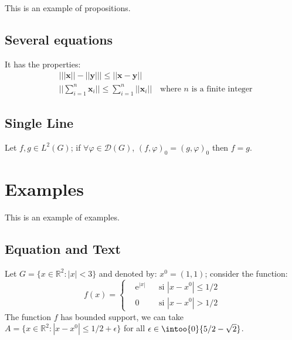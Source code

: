 \documentclass[11pt,fleqn]{book} %
\begin{document}
This is an example of propositions.

\subsection{Several equations}

\begin{proposition}
It has the properties:
\begin{align}
& \big| ||\mathbf{x}|| - ||\mathbf{y}|| \big|\leq || \mathbf{x}- \mathbf{y}||\\
&  ||\sum_{i=1}^n\mathbf{x}_i||\leq \sum_{i=1}^n||\mathbf{x}_i||\quad\text{where $n$ is a finite integer}
\end{align}
\end{proposition}

\subsection{Single Line}

\begin{proposition} 
Let $f,g\in L^2(G)$; if $\forall \varphi\in\mathcal{D}(G)$, $(f,\varphi)_0=(g,\varphi)_0$ then $f = g$. 
\end{proposition}


\section{Examples}

This is an example of examples.

\subsection{Equation and Text}

\begin{example}
Let $G=\{x\in\mathbb{R}^2:|x|<3\}$ and denoted by: $x^0=(1,1)$; consider the function:
\begin{equation}
f(x)=\left\{\begin{aligned} & \mathrm{e}^{|x|} & & \text{si $|x-x^0|\leq 1/2$}\\
& 0 & & \text{si $|x-x^0|> 1/2$}\end{aligned}\right.
\end{equation}
The function $f$ has bounded support, we can take $A=\{x\in\mathbb{R}^2:|x-x^0|\leq 1/2+\epsilon\}$ for all $\epsilon\in\intoo{0}{5/2-\sqrt{2}}$.
\end{example}
\end{document}
